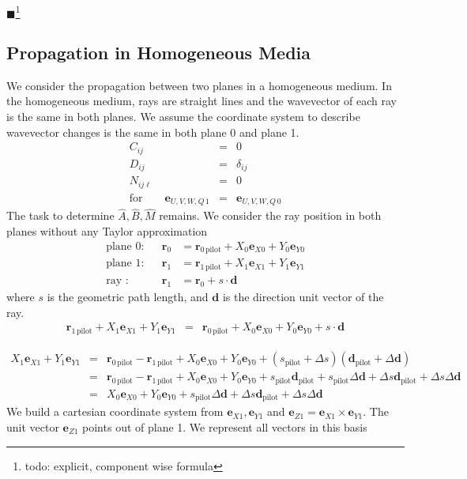 \documentclass[12pt,a4paper,twoside,openright,BCOR10mm,headsepline,titlepage,abstracton,chapterprefix,final]{scrreprt}
\newcommand\Vector[1]{{\mathbf{#1}}}
\newcommand\Location{\Vector{r}}
\newcommand{\remark}[1]{{\color{red}$\blacksquare$}\footnote{{\color{red}#1}}}
\begin{document}
\remark{todo: explicit, component wise formula}

\subsection{Propagation in Homogeneous Media}
We consider the propagation between two planes in a homogeneous medium.
In the homogeneous medium, rays are straight lines and the wavevector of each ray is the same in both planes.
We assume the coordinate system to describe wavevector changes is the same in both plane 0 and plane 1.
\begin{eqnarray}
C_{ij} &=& 0 \\
D_{ij} &=& \delta_{ij} \\
N_{ij\ell} &=& 0 \\
\text{for}\qquad \Vector{e}_{U,V,W,Q\,1} &=& \Vector{e}_{U,V,W,Q\,0} \nonumber
\end{eqnarray}
The task to determine $\hat{A},\hat{B}, \hat{M}$ remains. 
We consider the ray position in both planes without any Taylor approximation
\begin{align}
 \text{plane 0:} && \Location_0 &= \Location_{0\,\text{pilot}} + X_0 \Vector{e}_{X0} + Y_0 \Vector{e}_{Y0} \\
 \text{plane 1:} && \Location_1 &= \Location_{1\,\text{pilot}} + X_1 \Vector{e}_{X1} + Y_1 \Vector{e}_{Y1} \\
 \text{ray :} && \Location_1 &= \Location_{0} + s \cdot \Vector{d}
\end{align}
where $s$ is the geometric path length, and $\Vector{d}$ is the direction unit vector of the ray.
\begin{eqnarray}
\Location_{1\,\text{pilot}} + X_1 \Vector{e}_{X1} + Y_1 \Vector{e}_{Y1} &=& \Location_{0\,\text{pilot}} + X_0 \Vector{e}_{X0} + Y_0 \Vector{e}_{Y0}  + s \cdot \Vector{d}
\end{eqnarray}

\begin{eqnarray}
  X_1 \Vector{e}_{X1} + Y_1 \Vector{e}_{Y1} 
  &=& 
  \Location_{0\,\text{pilot}} - \Location_{1\,\text{pilot}} + X_0 \Vector{e}_{X0} + Y_0 \Vector{e}_{Y0}  + (s_{\text{pilot}} + \Delta s) ( \Vector{d}_{\text{pilot}} + \Delta \Vector{d} )
\\
  &=& 
  \Location_{0\,\text{pilot}} - \Location_{1\,\text{pilot}} + X_0 \Vector{e}_{X0} + Y_0 \Vector{e}_{Y0}  
  + s_{\text{pilot}} \Vector{d}_{\text{pilot}} 
  + s_{\text{pilot}} \Delta \Vector{d} 
  + \Delta s \Vector{d}_{\text{pilot}}
  + \Delta s \Delta \Vector{d}
\\
  &=& 
  X_0 \Vector{e}_{X0} + Y_0 \Vector{e}_{Y0}  
  + s_{\text{pilot}} \Delta \Vector{d} 
  + \Delta s \Vector{d}_{\text{pilot}}
  + \Delta s \Delta \Vector{d}
\end{eqnarray}
We build a cartesian coordinate system from $\Vector{e}_{X1}, \Vector{e}_{Y1}$ and $\Vector{e}_{Z1} = \Vector{e}_{X1} \times \Vector{e}_{Y1}$.
The unit vector $\Vector{e}_{Z1}$ points out of plane 1. We represent all vectors in this basis
\end{document}
